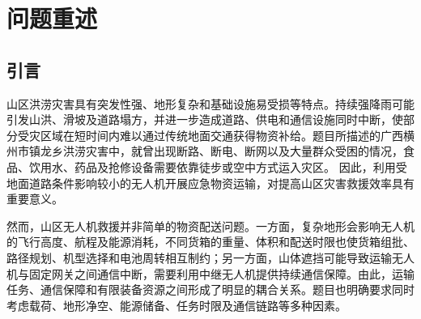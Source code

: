 \documentclass[bwprint,fontset=fandol]{gmcmthesis}
\begin{document}
\begin{abstract}
针对问题四，为研究灾后分区独立救援条件下的资源配置问题，根据问题三中已经确定的运输架次和通信保障关系构建\textbf{服务区任务耦合图}。若多个服务区位于同一运输架次或存在不可分割的联合保障关系，则将其合并为不可拆分的任务单元，并分别建立两分区和三分区优化模型。在保持原运输与中继任务安排不变的条件下，以\textbf{资源配置规模、资源冗余、组间工作量均衡和现有库存缺口}为主要评价指标进行分区优化；同时基于任务占用时间区间计算各分区运输无人机、共享电池、中继无人机及能源组件的最大并发需求，从而得到各分区独立执行所需的最小资源配置，并识别潜在资源瓶颈及其形成原因。

综上，本文将\textbf{地形约束、运输调度、能源周转与连续通信保障}统一纳入山区应急无人机救援决策框架，在保证货箱不可拆分、任务时限、返航安全以及通信连续性的基础上，实现了由单架次能力分析到多机协同、再到运输--通信联合优化与灾区资源分区配置的逐层扩展。所建立模型具有明确的物理含义和较好的可解释性，可为山区洪涝灾害条件下无人机应急运输与通信资源协同配置提供定量化决策依据。

\end{abstract}

\pagestyle{plain}

\maketoc

\clearpage

\section{问题重述}

\subsection{引言}   %
山区洪涝灾害具有突发性强、地形复杂和基础设施易受损等特点。持续强降雨可能引发山洪、滑坡及道路塌方，并进一步造成道路、供电和通信设施同时中断，使部分受灾区域在短时间内难以通过传统地面交通获得物资补给。题目所描述的广西横州市镇龙乡洪涝灾害中，就曾出现断路、断电、断网以及大量群众受困的情况，食品、饮用水、药品及抢修设备需要依靠徒步或空中方式运入灾区。 因此，利用受地面道路条件影响较小的无人机开展应急物资运输，对提高山区灾害救援效率具有重要意义。

然而，山区无人机救援并非简单的物资配送问题。一方面，复杂地形会影响无人机的飞行高度、航程及能源消耗，不同货箱的重量、体积和配送时限也使货箱组批、路径规划、机型选择和电池周转相互制约；另一方面，山体遮挡可能导致运输无人机与固定网关之间通信中断，需要利用中继无人机提供持续通信保障。由此，运输任务、通信保障和有限装备资源之间形成了明显的耦合关系。题目也明确要求同时考虑载荷、地形净空、能源储备、任务时限及通信链路等多种因素。
\end{document}
